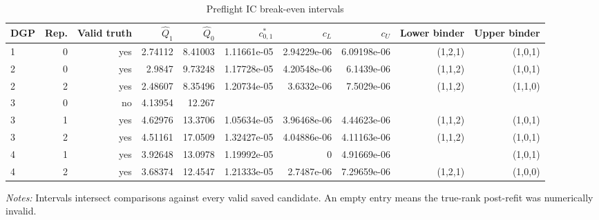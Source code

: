 \begin{table}[!htbp]
\centering
\caption{Preflight IC break-even intervals}
\label{tab:ic-break-even}
\begin{tabular}{lrrrrrrrrr}
\toprule
DGP & Rep. & Valid truth & $\widehat Q_1$ & $\widehat Q_0$ & $c^*_{0,1}$ & $c_L$ & $c_U$ & Lower binder & Upper binder \\
\midrule
1 & 0 & yes & 2.74112 & 8.41003 & 1.11661e-05 & 2.94229e-06 & 6.09198e-06 & (1,2,1) & (1,0,1) \\
2 & 0 & yes & 2.9847 & 9.73248 & 1.17728e-05 & 4.20548e-06 & 6.1439e-06 & (1,1,2) & (1,0,1) \\
2 & 2 & yes & 2.48607 & 8.35496 & 1.20734e-05 & 3.6332e-06 & 7.5029e-06 & (1,1,2) & (1,1,0) \\
3 & 0 & no & 4.13954 & 12.267 &  &  &  &  &  \\
3 & 1 & yes & 4.62976 & 13.3706 & 1.05634e-05 & 3.96468e-06 & 4.44623e-06 & (1,1,2) & (1,0,1) \\
3 & 2 & yes & 4.51161 & 17.0509 & 1.32427e-05 & 4.04886e-06 & 4.11163e-06 & (1,1,2) & (1,0,1) \\
4 & 1 & yes & 3.92648 & 13.0978 & 1.19992e-05 & 0 & 4.91669e-06 &  & (1,0,1) \\
4 & 2 & yes & 3.68374 & 12.4547 & 1.21333e-05 & 2.7487e-06 & 7.29659e-06 & (1,2,1) & (1,0,0) \\
\bottomrule
\end{tabular}
\begin{minipage}{0.96\linewidth}\footnotesize \textit{Notes:} Intervals intersect comparisons against every valid saved candidate. An empty entry means the true-rank post-refit was numerically invalid.\end{minipage}
\end{table}
